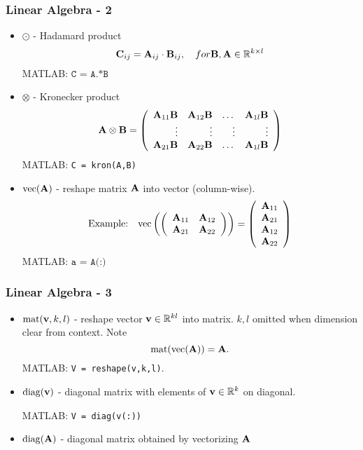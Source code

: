 \documentclass[12pt,fleqn]{beamer}
\begin{document}
\begin{frame}
	\frametitle{Linear Algebra - 2}
	\begin{itemize}
		\item $\odot$ - Hadamard product
		$$
			{\bf C}_{ij} = {\bf A}_{ij} \cdot {\bf B}_{ij}, \quad for {\bf B},{\bf A} \in \mathbb{R}^{k\times l}
		$$
		MATLAB: $\texttt{C = A.*B}$
		\item $\otimes$ - Kronecker product
		$$
			{\bf A} \otimes {\bf B} = \left(
				\begin{array}{rrrrr}
					{\bf A}_{11} {\bf B} & {\bf A}_{12} {\bf B} & \dots & {\bf A}_{1l} {\bf B} \\
					\vdots         & \vdots         & \vdots& \vdots\\
					{\bf A}_{21} {\bf B} & {\bf A}_{22} {\bf B} & \dots & {\bf A}_{1l} {\bf B} \\
				\end{array}
			\right)
		$$
		MATLAB: \texttt{C = kron(A,B)}
		\item ${\rm vec}({\bf A})$ - reshape matrix ${\bf A}$ into vector (column-wise). 
		$$
		\text{Example:}\quad
			{\rm vec}\left(
				\left(
					\begin{array}{rr}
						{\bf A}_{11} & {\bf A}_{12} \\
						{\bf A}_{21} & {\bf A}_{22} 
					\end{array}
				\right)
			\right) = \left( 
				\begin{array}{r}
					{\bf A}_{11}\\
					{\bf A}_{21} \\
					{\bf A}_{12}\\
					{\bf A}_{22}
				\end{array}
			\right)
		$$
		MATLAB: $\texttt{a = A(:)}$
	\end{itemize}
\end{frame}


\begin{frame}
	\frametitle{Linear Algebra - 3}
	\begin{itemize}
		\item ${\rm mat}({\bf v},k,l)$ - reshape vector ${\bf v}\in\mathbb{R}^{kl}$ into matrix. $k,l$ omitted when dimension clear from context. Note
		$$
			{\rm mat}({\rm vec} ({\bf A})) = {\bf A}.
		$$
		MATLAB: \texttt{V = reshape(v,k,l)}.
	
		\item ${\rm diag}({\bf v})$ - diagonal matrix with elements of ${\bf v} \in \mathbb{R}^k$ on diagonal.
		
		MATLAB: \texttt{V = diag(v(:))}
		
		\item ${\rm diag}({\bf A})$ - diagonal matrix obtained by vectorizing ${\bf A}$
	\end{itemize}
\end{frame}
\end{document}
